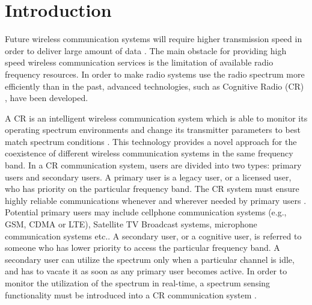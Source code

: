 \chapter{Introduction}
Future wireless communication systems will require higher transmission speed in order to deliver large amount of data \cite{pelcat20133gpp}. The main obstacle for providing high speed wireless communication services is the limitation of available radio frequency resources. In order to make radio systems use the radio spectrum more efficiently than in the past, advanced technologies, such as Cognitive Radio (CR) \cite{federal2005notice}, have been developed.  

A CR is an intelligent wireless communication system which is able to monitor its operating spectrum environments and change its transmitter parameters to best match spectrum conditions \cite{wang2011advances, a001}. This technology provides a novel approach for the coexistence of different wireless communication systems in the same frequency band. In a CR communication system, users are divided into two types: primary users and secondary users. A primary user is a legacy user, or a licensed user, who has priority on the particular frequency band. The CR system must ensure highly reliable communications whenever and wherever needed by primary users \cite{a001}. Potential primary users may include cellphone communication systems (e.g., GSM, CDMA or LTE), Satellite TV Broadcast systems, microphone communication systems etc.. A secondary user, or a cognitive user, is referred to someone who has lower priority to access the particular frequency band. A secondary user can utilize the spectrum only when a particular channel is idle, and has to vacate it as soon as any primary user becomes active. 
In order to monitor the utilization of the spectrum in real-time, a spectrum sensing functionality must be introduced into a CR communication system \cite{buddhikot2007understanding, tandra2009spectrum}.   

